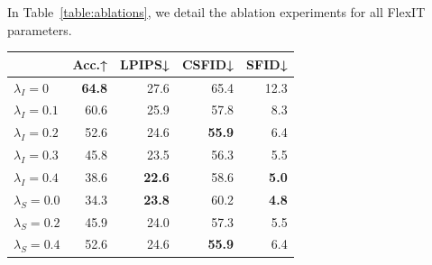 In Table~\ref{table:ablations}, we detail the ablation experiments for all FlexIT parameters.

\begin{table}[h!]
\center
\begin{tabular}{lrrrr}
\toprule
 & \textbf{Acc.↑} & \textbf{LPIPS↓} & \textbf{CSFID↓} & \textbf{SFID↓} \\
\midrule
                   $\lambda_I=0$ & \textbf{64.8} &   27.6 &   65.4 & 12.3 \\
                   $\lambda_I=0.1$ & 60.6 &   25.9 &   57.8 &  8.3 \\
                     
                    \rowcolor{LightGrey} $\lambda_I=0.2$   & 52.6 &   24.6 &   \textbf{55.9} &  6.4 \\
                   $\lambda_I=0.3$ & 45.8 &   23.5 &   56.3 &  5.5 \\
                   $\lambda_I=0.4$ & 38.6 &   \textbf{22.6} &   58.6 &  \textbf{5.0} \\
                   \midrule
                   $\lambda_S=0.0$ & 34.3 &   \textbf{23.8} &   60.2 &  \textbf{4.8} \\
                  $\lambda_S=0.2$ & 45.9 &   24.0 &   57.3 &  5.5 \\
                  \rowcolor{LightGrey} $\lambda_S=0.4$   & 52.6 &   24.6 &   \textbf{55.9} &  6.4 \\
                  

\end{tabular}
\end{table}
